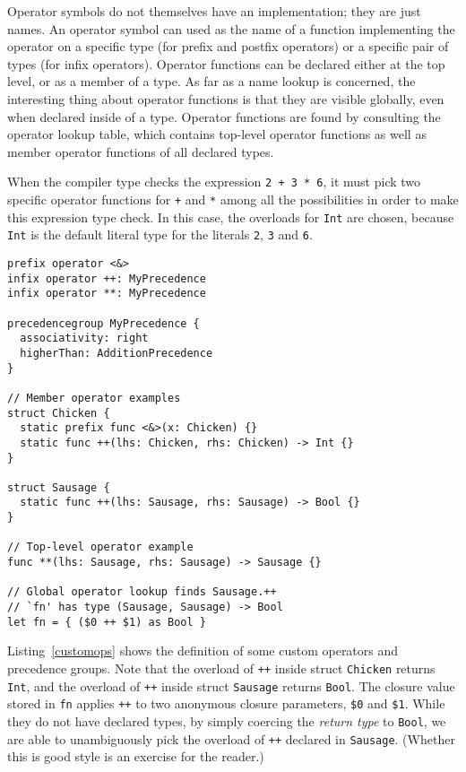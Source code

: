 \documentclass[a4paper,headsepline,bibliography=totoc,toc=flat,fleqn,twoside=semi]{scrbook}
\theoremstyle{definition}
\theoremstyle{definition}
\theoremstyle{definition}
\begin{document}
Operator symbols do not themselves have an implementation; they are just names. An operator symbol can used as the name of a function implementing the operator on a specific type (for prefix and postfix operators) or a specific pair of types (for infix operators). Operator functions can be declared either at the top level, or as a member of a type. As far as a name lookup is concerned, the interesting thing about operator functions is that they are visible globally, even when declared inside of a type. Operator functions are found by consulting the operator lookup table, which contains top-level operator functions as well as member operator functions of all declared types.

When the compiler type checks the expression \texttt{2 + 3 * 6}, it must pick two specific operator functions for \texttt{+} and \texttt{*} among all the possibilities in order to make this expression type check. In this case, the overloads for \texttt{Int} are chosen, because \texttt{Int} is the default literal type for the literals \texttt{2}, \texttt{3} and \texttt{6}.

\begin{listing}\label{customops}
\begin{Verbatim}
prefix operator <&>
infix operator ++: MyPrecedence
infix operator **: MyPrecedence

precedencegroup MyPrecedence {
  associativity: right
  higherThan: AdditionPrecedence
}

// Member operator examples
struct Chicken {
  static prefix func <&>(x: Chicken) {}
  static func ++(lhs: Chicken, rhs: Chicken) -> Int {}
}

struct Sausage {
  static func ++(lhs: Sausage, rhs: Sausage) -> Bool {}
}

// Top-level operator example
func **(lhs: Sausage, rhs: Sausage) -> Sausage {}

// Global operator lookup finds Sausage.++
// `fn' has type (Sausage, Sausage) -> Bool
let fn = { ($0 ++ $1) as Bool }
\end{Verbatim}
\end{listing}
Listing~\ref{customops} shows the definition of some custom operators and precedence groups. Note that the overload of \texttt{++} inside struct \texttt{Chicken} returns \texttt{Int}, and the overload of \texttt{++} inside struct \texttt{Sausage} returns \texttt{Bool}. The closure value stored in \texttt{fn} applies \texttt{++} to two anonymous closure parameters, \verb|$0| and \verb|$1|. While they do not have declared types, by simply coercing the \emph{return type} to \texttt{Bool}, we are able to unambiguously pick the overload of \texttt{++} declared in \texttt{Sausage}. (Whether this is good style is an exercise for the reader.)
\end{document}

